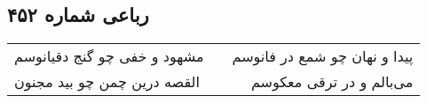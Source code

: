 \begin{center}
\section*{رباعی شماره ۴۵۲}
\label{sec:sh452}
\begin{longtable}{l p{0.5cm} r}
مشهود و خفی چو گنج دقیانوسم
&&
پیدا و نهان چو شمع در فانوسم
\\
القصه درین چمن چو بید مجنون
&&
می‌بالم و در ترقی معکوسم
\\
\end{longtable}
\end{center}
